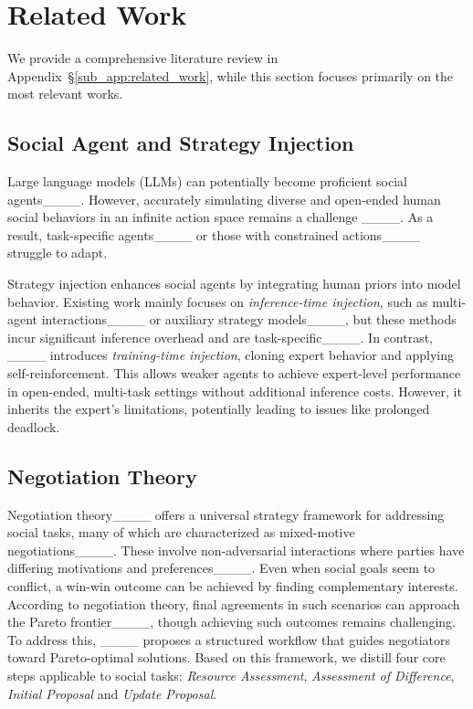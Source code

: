 \section{Related Work}
We provide a comprehensive literature review in Appendix~\S\ref{sub_app:related_work}, while this section focuses primarily on the most relevant works.

\subsection{Social Agent and Strategy Injection}
Large language models (LLMs) can potentially become proficient social agents____. 
% 
However, accurately simulating diverse and open-ended human social behaviors in an infinite action space remains a challenge ____.
% 
As a result, task-specific agents____ or those with constrained actions____ struggle to adapt.



Strategy injection enhances social agents by integrating human priors into model behavior. 
% 
Existing work mainly focuses on \textit{inference-time injection}, such as multi-agent interactions____ or auxiliary strategy models____, but these methods incur significant inference overhead and are task-specific____. 
% 
In contrast, ____ introduces \textit{training-time injection}, cloning expert behavior and applying self-reinforcement. 
% 
This allows weaker agents to achieve expert-level performance in open-ended, multi-task settings without additional inference costs.
However, it inherits the expert’s limitations, potentially leading to issues like prolonged deadlock.


\subsection{Negotiation Theory}
\label{sec:related_work_negotiation}

Negotiation theory____ offers a universal strategy framework for addressing social tasks, many of which are characterized as mixed-motive negotiations____. 
% 
These involve non-adversarial interactions where parties have differing motivations and preferences____. 
% 
Even when social goals seem to conflict, a win-win outcome can be achieved by finding complementary interests.
% 
According to negotiation theory, final agreements in such scenarios can approach the Pareto frontier____, though achieving such outcomes remains challenging. 
% 
To address this, ____ proposes a structured workflow that guides negotiators toward Pareto-optimal solutions. 
% 
Based on this framework, we distill four core steps applicable to social tasks: \textit{Resource Assessment}, \textit{Assessment of Difference}, \textit{Initial Proposal} and \textit{Update Proposal}.